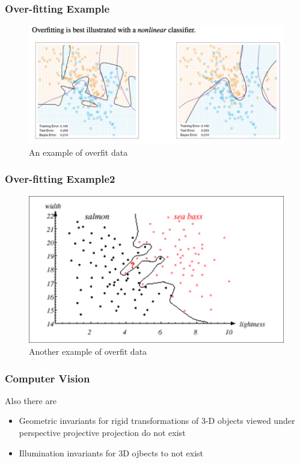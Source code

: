 \documentclass[10pt]{beamer}
\begin{document}
\begin{frame}
	\frametitle{Over-fitting Example}
	\begin{figure}
		\includegraphics[width=\textwidth,height=0.85\textheight,keepaspectratio=true]{overfit_scatter.png}
		\caption{An example of overfit data}
	\end{figure}
\end{frame}
\begin{frame}
	\frametitle{Over-fitting Example2}
	\begin{figure}
		\includegraphics[width=\textwidth,height=0.85\textheight,keepaspectratio=true]{classifier_fish.png}
		\caption{Another example of overfit data}
	\end{figure}
\end{frame}

\begin{frame}
	\frametitle{Computer Vision}
	Also there are
	\begin{itemize}
		\item Geometric invariants for rigid transformations of 3-D objects viewed under perspective projective projection do not exist\citep{Burns:1993ih}
		\item Illumination invariants for 3D ojbects to not exist \citep{Chen:ba}
	\end{itemize}
\end{frame}
\end{document}
